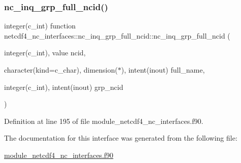 \subsubsection{\texorpdfstring{nc\+\_\+inq\+\_\+grp\+\_\+full\+\_\+ncid()}{nc\_inq\_grp\_full\_ncid()}}
{\footnotesize\ttfamily integer(c\+\_\+int) function netcdf4\+\_\+nc\+\_\+interfaces\+::nc\+\_\+inq\+\_\+grp\+\_\+full\+\_\+ncid\+::nc\+\_\+inq\+\_\+grp\+\_\+full\+\_\+ncid (\begin{DoxyParamCaption}\item[{integer(c\+\_\+int), value}]{ncid,  }\item[{character(kind=c\+\_\+char), dimension($\ast$), intent(inout)}]{full\+\_\+name,  }\item[{integer(c\+\_\+int), intent(inout)}]{grp\+\_\+ncid }\end{DoxyParamCaption})}



Definition at line 195 of file module\+\_\+netcdf4\+\_\+nc\+\_\+interfaces.\+f90.



The documentation for this interface was generated from the following file\+:\begin{DoxyCompactItemize}
\item 
\hyperlink{module__netcdf4__nc__interfaces_8f90}{module\+\_\+netcdf4\+\_\+nc\+\_\+interfaces.\+f90}\end{DoxyCompactItemize}
